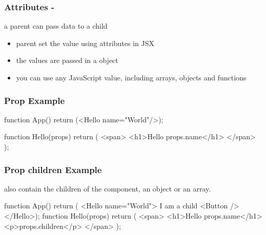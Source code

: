 \begin{frame}[fragile] \frametitle{Attributes - }
a parent can pass data to a child
\begin{itemize}
  \item parent set the value using attributes in JSX
  \item the values are passed in a  object
  \item you can use any JavaScript value, including arrays, objects and functions
\end{itemize}
\end{frame}

\begin{frame}[fragile] \frametitle{Prop Example}

\begin{CodeBox}{}
function App() {
  return (<Hello name="World"/>);
}

function Hello(props) {
  return (
    <span>
      <h1>Hello {props.name}</h1>
    </span>
  );
}
\end{CodeBox}
\end{frame}

\begin{frame}[fragile] \frametitle{Prop children Example}
 also contain the children of the component, an object or an array.
\begin{CodeBox}{}
function App() {
  return ( <Hello name="World">
                  I am a child <Button />
               </Hello>);
}
function Hello(props) {
  return (
    <span>
      <h1>Hello {props.name}</h1>
      <p>{props.children}</p>
    </span>
  );
}
\end{CodeBox}
\end{frame}


